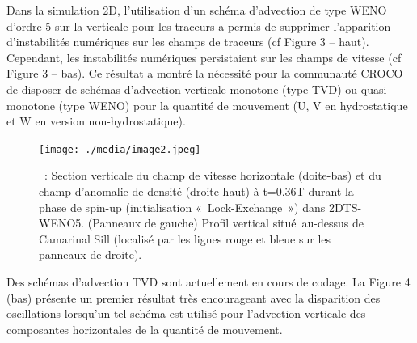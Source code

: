 \documentclass[12pt]{article}
\begin{document}
\begin{adjustwidth}{0.0in}{0.4in}
\begin{justify}
Dans la simulation 2D, l’utilisation d’un schéma d’advection de type WENO d’ordre 5 sur la verticale pour les traceurs a permis de supprimer l’apparition d’instabilités numériques sur les champs de traceurs (cf Figure 3 – haut). Cependant, les instabilités numériques persistaient sur les champs de vitesse (cf Figure 3 – bas). Ce résultat a montré la nécessité pour la communauté CROCO de disposer de schémas d’advection verticale monotone (type TVD) ou quasi-monotone (type WENO) pour la quantité de mouvement (U, V en hydrostatique et W en version non-hydrostatique). 
\end{justify}\par

\end{adjustwidth}




\begin{figure}[H]
	\begin{Center}
		\texttt{[image: ./media/image2.jpeg]}
		\caption{ : Section verticale du champ de vitesse horizontale (doite-bas) et du champ d’anomalie de densité (droite-haut) à t=0.36T durant la phase de spin-up (initialisation « Lock-Exchange ») dans 2DTS-WENO5. (Panneaux de gauche) Profil vertical situé\  au-dessus de Camarinal Sill (localisé par les lignes rouge et bleue sur les panneaux de droite).}
		\label{fig:_Section_verticale_du_champ_de_vitesse_horizontale_doitebas_et_du_champ_danomalie_de_densit_droitehaut__t036T_durant_la_phase_de_spinup_initialisation_LockExchange_dans_2DTSWENO5_Panneaux_de_gauche_Profil_vertical_situ__audessus_de_Camarinal_Sill_localis_par_les_lignes_rouge_et_bleue_sur_les_panneaux_de_droite}
	\end{Center}
\end{figure}



\par

\begin{adjustwidth}{0.0in}{0.39in}
\par

\end{adjustwidth}

\begin{adjustwidth}{0.0in}{0.4in}
\begin{justify}
Des schémas d’advection TVD sont actuellement en cours de codage. La Figure 4 (bas) présente un premier résultat très encourageant avec la disparition des oscillations lorsqu’un tel schéma est utilisé pour l’advection verticale des composantes horizontales de la quantité de mouvement. 
\end{justify}\par

\end{adjustwidth}
\end{document}
